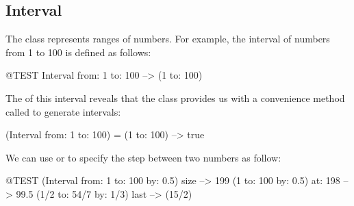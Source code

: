 \documentclass[a4paper,10pt,twoside]{book}
\begin{document}




\subsection{Interval}
The class  represents ranges of numbers. For example, the interval of numbers from 1 to 100 is defined as follows:
\begin{code}{@TEST}
Interval from: 1 to: 100 --> (1 to: 100)
\end{code}

\noindent
The  of this interval reveals that the class  provides us with a convenience method called  to generate intervals:

\begin{code}{}
(Interval from: 1 to: 100) = (1 to: 100) --> true
\end{code}

We can use  or  to specify the step between two numbers as follow:

\begin{code}{@TEST}
(Interval from: 1 to: 100 by: 0.5) size --> 199
(1 to: 100 by: 0.5) at: 198 --> 99.5
(1/2 to: 54/7 by: 1/3) last --> (15/2)
\end{code}
\end{document}
